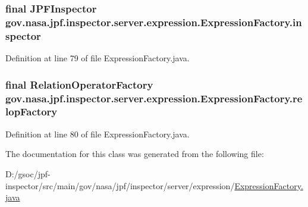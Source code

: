 \subsubsection[{\texorpdfstring{inspector}{inspector}}]{\setlength{\rightskip}{0pt plus 5cm}final {\bf J\+P\+F\+Inspector} gov.\+nasa.\+jpf.\+inspector.\+server.\+expression.\+Expression\+Factory.\+inspector\hspace{0.3cm}{\ttfamily [private]}}\hypertarget{classgov_1_1nasa_1_1jpf_1_1inspector_1_1server_1_1expression_1_1_expression_factory_a3a9c2a8f91b31b8105ed93e509fab8ca}{}\label{classgov_1_1nasa_1_1jpf_1_1inspector_1_1server_1_1expression_1_1_expression_factory_a3a9c2a8f91b31b8105ed93e509fab8ca}


Definition at line 79 of file Expression\+Factory.\+java.

\subsubsection[{\texorpdfstring{relop\+Factory}{relopFactory}}]{\setlength{\rightskip}{0pt plus 5cm}final {\bf Relation\+Operator\+Factory} gov.\+nasa.\+jpf.\+inspector.\+server.\+expression.\+Expression\+Factory.\+relop\+Factory\hspace{0.3cm}{\ttfamily [private]}}\hypertarget{classgov_1_1nasa_1_1jpf_1_1inspector_1_1server_1_1expression_1_1_expression_factory_a04112c5f8901f1f283af395fd7782326}{}\label{classgov_1_1nasa_1_1jpf_1_1inspector_1_1server_1_1expression_1_1_expression_factory_a04112c5f8901f1f283af395fd7782326}


Definition at line 80 of file Expression\+Factory.\+java.



The documentation for this class was generated from the following file\+:\begin{DoxyCompactItemize}
\item 
D\+:/gsoc/jpf-\/inspector/src/main/gov/nasa/jpf/inspector/server/expression/\hyperlink{_expression_factory_8java}{Expression\+Factory.\+java}\end{DoxyCompactItemize}
